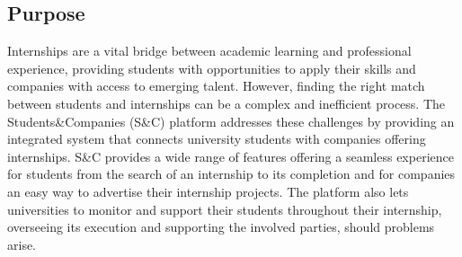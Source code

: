 \subsection{Purpose}
Internships are a vital bridge between academic learning and professional experience, providing students with opportunities to apply their skills and companies with access to emerging talent. However, finding the right match between students and internships can be a complex and inefficient process.
The Students\&Companies (S\&C) platform addresses these challenges by providing an integrated system that connects university students with companies offering internships. S\&C provides a wide range of features offering a seamless experience for students from the search of an internship to its completion and for companies an easy way to advertise their internship projects. The platform also lets universities to monitor and support their students throughout their internship, overseeing its execution and supporting the involved parties, should problems arise.
